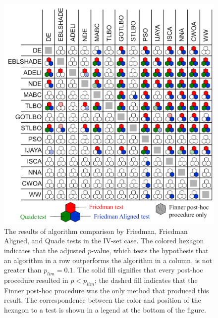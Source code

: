 \documentclass[a4paper,fleqn]{cas-dc}
\begin{document}
\begin{figure}[]
	\centering
		\includegraphics[width=1.0\columnwidth]{N1Tresult}
	  \caption{The results of algorithm comparison by Friedman, Friedman Aligned, and Quade tests in the IV-set case.
               The colored hexagon indicates that the adjusted $p$-value,
               which tests the hypothesis that an algorithm in a row outperforms the algorithm in a column,
               is not greater than $p_{lim}=0.1$.
               The solid fill signifies that every post-hoc procedure resulted in $p<p_{lim}$;
               the dashed fill indicates that the Finner post-hoc procedure was the only method that produced this result.
               The correspondence between the color and position of the hexagon to a test
               is shown in a legend at the bottom of the figure.
               }\label{figN1RezIVset}
\end{figure}
\end{document}
